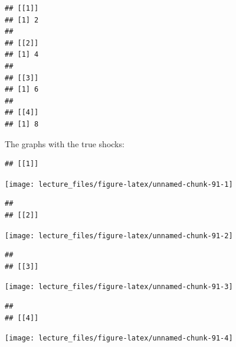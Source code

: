 \documentclass[]{book}
\newenvironment{Shaded}{\begin{snugshade}}{\end{snugshade}}
\newcommand{\KeywordTok}[1]{\textcolor[rgb]{0.13,0.29,0.53}{\textbf{#1}}}
\newcommand{\DataTypeTok}[1]{\textcolor[rgb]{0.13,0.29,0.53}{#1}}
\newcommand{\DecValTok}[1]{\textcolor[rgb]{0.00,0.00,0.81}{#1}}
\newcommand{\StringTok}[1]{\textcolor[rgb]{0.31,0.60,0.02}{#1}}
\newcommand{\CommentTok}[1]{\textcolor[rgb]{0.56,0.35,0.01}{\textit{#1}}}
\newcommand{\OperatorTok}[1]{\textcolor[rgb]{0.81,0.36,0.00}{\textbf{#1}}}
\newcommand{\NormalTok}[1]{#1}
\begin{document}
\begin{Shaded}
\end{Shaded}

\begin{verbatim}
## [[1]]
## [1] 2
## 
## [[2]]
## [1] 4
## 
## [[3]]
## [1] 6
## 
## [[4]]
## [1] 8
\end{verbatim}

The graphs with the true shocks:

\begin{verbatim}
## [[1]]
\end{verbatim}

\begin{center}\texttt{[image: lecture\_files/figure-latex/unnamed-chunk-91-1]} \end{center}

\begin{verbatim}
## 
## [[2]]
\end{verbatim}

\begin{center}\texttt{[image: lecture\_files/figure-latex/unnamed-chunk-91-2]} \end{center}

\begin{verbatim}
## 
## [[3]]
\end{verbatim}

\begin{center}\texttt{[image: lecture\_files/figure-latex/unnamed-chunk-91-3]} \end{center}

\begin{verbatim}
## 
## [[4]]
\end{verbatim}

\begin{center}\texttt{[image: lecture\_files/figure-latex/unnamed-chunk-91-4]} \end{center}
\end{document}
